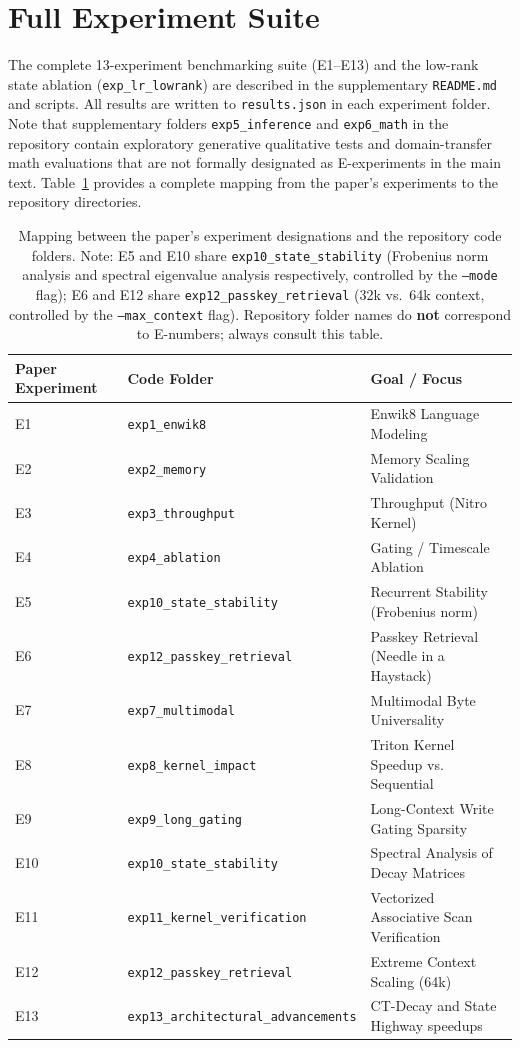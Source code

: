 \documentclass{article}
\begin{document}
\section{Full Experiment Suite}
\label{app:experiments}

The complete 13-experiment benchmarking suite (E1--E13) and the low-rank state
ablation (\texttt{exp\_lr\_lowrank}) are described in the supplementary
\texttt{README.md} and scripts. All results are written to \texttt{results.json}
in each experiment folder. Note that supplementary folders \texttt{exp5\_inference}
and \texttt{exp6\_math} in the repository contain exploratory generative qualitative
tests and domain-transfer math evaluations that are not formally designated as
E-experiments in the main text. Table~\ref{tab:mapping} provides a complete
mapping from the paper's experiments to the repository directories.

\begin{table}[H]
\centering
\caption{Mapping between the paper's experiment designations and the repository code folders. Note: E5 and E10 share \texttt{exp10\_state\_stability} (Frobenius norm analysis and spectral eigenvalue analysis respectively, controlled by the \texttt{--mode} flag); E6 and E12 share \texttt{exp12\_passkey\_retrieval} (32k vs.\ 64k context, controlled by the \texttt{--max\_context} flag). Repository folder names do \textbf{not} correspond to E-numbers; always consult this table.}
\label{tab:mapping}
\begin{tabular}{lll}
\toprule
Paper Experiment & Code Folder & Goal / Focus \\
\midrule
E1 & \texttt{exp1\_enwik8} & Enwik8 Language Modeling \\
E2 & \texttt{exp2\_memory} & Memory Scaling Validation \\
E3 & \texttt{exp3\_throughput} & Throughput (Nitro Kernel) \\
E4 & \texttt{exp4\_ablation} & Gating / Timescale Ablation \\
E5 & \texttt{exp10\_state\_stability} & Recurrent Stability (Frobenius norm) \\
E6 & \texttt{exp12\_passkey\_retrieval} & Passkey Retrieval (Needle in a Haystack) \\
E7 & \texttt{exp7\_multimodal} & Multimodal Byte Universality \\
E8 & \texttt{exp8\_kernel\_impact} & Triton Kernel Speedup vs. Sequential \\
E9 & \texttt{exp9\_long\_gating} & Long-Context Write Gating Sparsity \\
E10 & \texttt{exp10\_state\_stability} & Spectral Analysis of Decay Matrices \\
E11 & \texttt{exp11\_kernel\_verification} & Vectorized Associative Scan Verification \\
E12 & \texttt{exp12\_passkey\_retrieval} & Extreme Context Scaling (64k) \\
E13 & \texttt{exp13\_architectural\_advancements} & CT-Decay and State Highway speedups \\
\bottomrule
\end{tabular}
\end{table}
\end{document}
